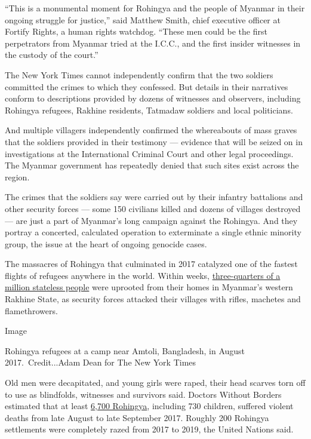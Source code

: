 ``This is a monumental moment for Rohingya and the people of Myanmar in
their ongoing struggle for justice,'' said Matthew Smith, chief
executive officer at Fortify Rights, a human rights watchdog. ``These
men could be the first perpetrators from Myanmar tried at the I.C.C.,
and the first insider witnesses in the custody of the court.''

The New York Times cannot independently confirm that the two soldiers
committed the crimes to which they confessed. But details in their
narratives conform to descriptions provided by dozens of witnesses and
observers, including Rohingya refugees, Rakhine residents, Tatmadaw
soldiers and local politicians.

And multiple villagers independently confirmed the whereabouts of mass
graves that the soldiers provided in their testimony --- evidence that
will be seized on in investigations at the International Criminal Court
and other legal proceedings. The Myanmar government has repeatedly
denied that such sites exist across the region.

The crimes that the soldiers say were carried out by their infantry
battalions and other security forces --- some 150 civilians killed and
dozens of villages destroyed --- are just a part of Myanmar's long
campaign against the Rohingya. And they portray a concerted, calculated
operation to exterminate a single ethnic minority group, the issue at
the heart of ongoing genocide cases.

The massacres of Rohingya that culminated in 2017 catalyzed one of the
fastest flights of refugees anywhere in the world. Within weeks,
\href{https://www.nytimes3xbfgragh.onion/2019/08/22/world/asia/rohingya-myanmar-repatriation.html}{three-quarters
of a million stateless people} were uprooted from their homes in
Myanmar's western Rakhine State, as security forces attacked their
villages with rifles, machetes and flamethrowers.

Image

Rohingya refugees at a camp near Amtoli, Bangladesh, in August
2017.~Credit...Adam Dean for The New York Times

Old men were decapitated, and young girls were raped, their head scarves
torn off to use as blindfolds, witnesses and survivors said. Doctors
Without Borders estimated that at least
\href{https://www.nytimes3xbfgragh.onion/2017/12/14/world/asia/myanmar-rohingya-deaths.html}{6,700
Rohingya}, including 730 children, suffered violent deaths from late
August to late September 2017. Roughly 200 Rohingya settlements were
completely razed from 2017 to 2019, the United Nations said.


